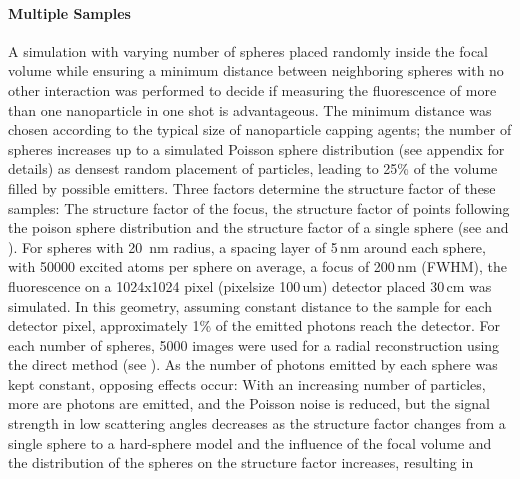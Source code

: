 



\paragraph{Multiple Samples}

A simulation with varying number of spheres placed randomly inside the focal volume while ensuring a minimum distance between neighboring spheres with no other interaction was performed to decide if measuring the fluorescence of more than one nanoparticle in one shot is advantageous.
The minimum distance was chosen according to the typical size of nanoparticle capping agents; the number of spheres increases up to a simulated Poisson sphere distribution (see appendix  for details) as densest random placement of particles, leading to 25\% of the volume filled by possible emitters.
Three factors determine the structure factor of these samples: The structure factor of the focus, the structure factor of points following the poison sphere distribution  and the structure factor of a single sphere (see  and ). 
For spheres with 20\, nm radius, a spacing layer of 5\,nm around each sphere, with  50000 excited atoms per sphere on average, a focus of 200\,nm (FWHM), the fluorescence on a 1024x1024 pixel (pixelsize 100\,um) detector placed 30\,cm was simulated. In this geometry, assuming constant distance to the sample for each detector pixel, approximately 1\% of the emitted photons reach the detector.  For each number of spheres, 5000 images were used for a radial reconstruction using the direct method (see ).
As the number of photons emitted by each sphere was kept constant, opposing effects occur:  With an increasing number of particles, more are photons are emitted, and the Poisson noise is reduced, but the signal strength in low scattering angles decreases as the structure factor changes from a single sphere to a hard-sphere model and the influence of the focal volume and the distribution of the spheres on the structure factor increases, resulting in 

